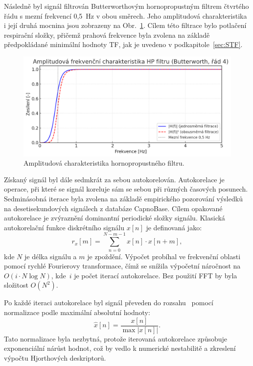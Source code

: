 Následně byl signál filtrován Butterworthovým hornopropustným filtrem čtvrtého řádu s mezní frekvencí 0,5~Hz v obou směrech.
Jeho amplitudová charakteristika i její druhá mocnina jsou zobrazeny na Obr.~\ref{fig:hjorth_filter}.
Cílem této filtrace bylo potlačení respirační složky, přičemž prahová frekvence byla zvolena na základě předpokládané minimální hodnoty \acs{TF}, jak je uvedeno v podkapitole~\ref{sec:STF}.

\begin{figure}[!th]
	\centering
	\includegraphics[width=1\textwidth]{./obrazky/hjorth/hp_filter_response_linear.png}
	\caption[Amplitudová charakteristika hornopropustného filtru]{Amplitudová charakteristika hornopropustného filtru.}
	\label{fig:hjorth_filter}
\end{figure}

Získaný signál byl dále sedmkrát za sebou autokorelován.
Autokorelace je operace, při které se signál koreluje sám se sebou při různých časových posunech.
Sedminásobná iterace byla zvolena na základě empirického pozorování výsledků na desetisekundových signálech z databáze CapnoBase.
Cílem opakované autokorelace je zvýraznění dominantní periodické složky signálu.
Klasická autokorelační funkce diskrétního signálu \( x[n] \) je definovaná jako:
\begin{equation}
	r_x[m] = \sum_{n=0}^{N-m-1} x[n] \cdot x[n+m],
\end{equation}
kde \( N \) je délka signálu a \( m \) je zpoždění.
Výpočet probíhal ve frekvenční oblasti pomocí rychlé Fourierovy transformace, čímž se snížila výpočetní náročnost na~\(O(i \cdot N \log N)\), kde~\(i\) je počet iterací autokorelace.
Bez použití \acs{FFT} by byla složitost \(O(N^2)\).

Po každé iteraci autokorelace byl signál převeden do rozsahu~\(<-1, 1>\) pomocí normalizace podle maximální absolutní hodnoty:
\begin{equation}
	\hat{x}[n] = \frac{x[n]}{\max |x[n]|}.
\end{equation}
Tato normalizace byla nezbytná, protože iterovaná autokorelace způsobuje exponenciální nárůst hodnot, což by vedlo k numerické nestabilitě a zkreslení výpočtu Hjorthových deskriptorů.

